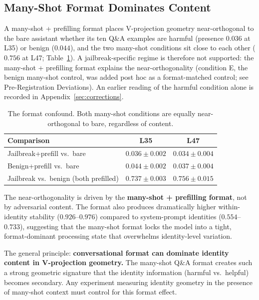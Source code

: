 \documentclass[11pt,a4paper]{article}
\begin{document}
\subsection{Many-Shot Format Dominates Content}

A many-shot + prefilling format places V-projection geometry
near-orthogonal to the bare assistant whether its ten Q\&A examples are
harmful (presence $0.036$ at L35) or benign ($0.044$), and the two
many-shot conditions sit close to each other ($0.756$ at L47;
Table~\ref{tab:format_kill}). A jailbreak-specific regime is therefore not
supported: the many-shot + prefilling format explains the
near-orthogonality (condition E, the benign many-shot control, was added
post hoc as a format-matched control; see Pre-Registration Deviations). An
earlier reading of the harmful condition alone is recorded in
Appendix~\ref{sec:corrections}.

\begin{table}[H]
\centering
\caption{The format confound. Both many-shot conditions are equally
near-orthogonal to bare, regardless of content.}
\label{tab:format_kill}
\begin{tabular}{lcc}
\toprule
Comparison & L35 & L47 \\
\midrule
Jailbreak+prefill vs.\ bare & $0.036 \pm 0.002$ & $0.034 \pm 0.004$ \\
Benign+prefill vs.\ bare & $0.044 \pm 0.002$ & $0.037 \pm 0.004$ \\
Jailbreak vs.\ benign (both prefilled) & $0.737 \pm 0.003$ & $0.756 \pm 0.015$ \\
\bottomrule
\end{tabular}
\end{table}

The near-orthogonality is driven by the \textbf{many-shot + prefilling format},
not by adversarial content. The format also produces
dramatically higher within-identity stability ($0.926$--$0.976$) compared
to system-prompt identities ($0.554$--$0.733$), suggesting that the
many-shot format locks the model into a tight, format-dominant processing
state that overwhelms identity-level variation.

The general principle: \textbf{conversational format can dominate identity content in
V-projection geometry.} The many-shot Q\&A format creates such a strong
geometric signature that the identity information (harmful vs.\ helpful)
becomes secondary. Any experiment measuring identity geometry in the
presence of many-shot context must control for this format effect.
\end{document}
